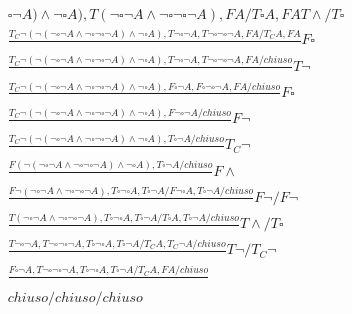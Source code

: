 \documentclass[a4paper,12pt, oneside]{book}
\begin{document}
\begin{esempio}
{{\begin{gather*}
{    \square\neg A)\land\neg\square A), T(\neg\square\neg A\land \neg
    \square \neg  \square\neg A), FA/T\square A, FA}{}T\land/T\square\\
    \frac{T_C\neg(\neg(\neg\square\neg A\land \neg \square \neg
    \square\neg A)\land\neg\square A), T\neg\square\neg A,T \neg
    \square \neg  \square\neg A, FA/T_C A, FA}{}F\square\\
    \frac{T_C\neg(\neg(\neg\square\neg A\land \neg \square \neg
    \square\neg A)\land\neg\square A), T\neg\square\neg A,T \neg
    \square \neg  \square\neg A, FA/chiuso}{}T\neg\\
    \frac{T_C\neg(\neg(\neg\square\neg A\land \neg \square \neg
    \square\neg A)\land\neg\square A), F\square\neg A,F
    \square \neg  \square\neg A, FA/chiuso}{}F\square\\
    \frac{T_C\neg(\neg(\neg\square\neg A\land \neg \square \neg
    \square\neg A)\land\neg\square A),F\neg  \square\neg A/chiuso}{}F\neg\\
    \frac{T_C\neg(\neg(\neg\square\neg A\land \neg \square \neg
    \square\neg A)\land\neg\square A),T\square\neg A/chiuso}{}T_C\neg\\
    \frac{F(\neg(\neg\square\neg A\land \neg \square \neg
    \square\neg A)\land\neg\square A),T\square\neg A/chiuso}{}F\land\\
    \frac{F\neg(\neg\square\neg A\land \neg \square \neg
    \square\neg A), T\square\neg\square A,T\square\neg A/F\neg\square A,
    T\square\neg A/chiuso}{}F\neg/F\neg\\
    \frac{T(\neg\square\neg A\land \neg \square \neg
    \square\neg A), T\square\neg\square A,T\square\neg A/T\square A,
    T\square\neg A/chiuso}{}T\land/T\square\\
    \frac{T\neg\square\neg A,T\neg \square \neg
    \square\neg A, T\square\neg\square A,T\square\neg A/ T_C A,
    T_C\neg A/chiuso}{}T\neg/T_C\neg\\
    \frac{F\square\neg A,T\neg \square \neg
    \square\neg A, T\square\neg\square A,T\square\neg A/ T_C A,
    FA/chiuso}{}\\
    chiuso/chiuso/chiuso
  \end{gather*}
  }}
\end{esempio}
\end{document}
